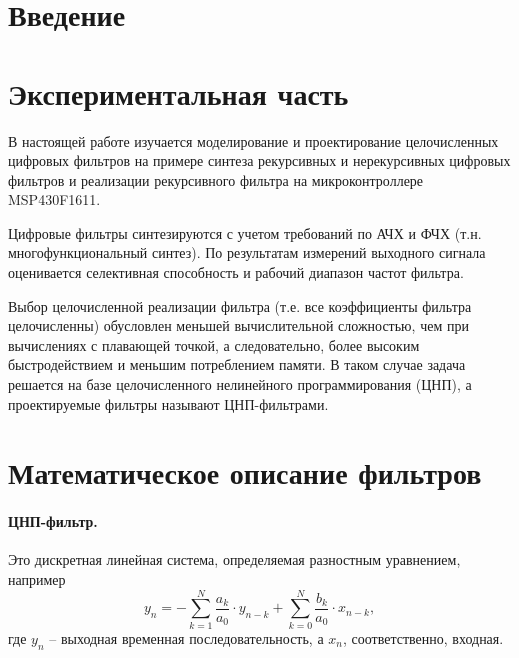 



\def\labauthors{Карусевич А.А., Шиков А.П., Виноградов И.Д., Понур К.А.}
\def\labgroup{440}
\def\labnumber{1}
\def\labtheme{Синтез и реализация цифрового целочисленного фильтра на микроконтроллере}
\renewcommand{\vec}{\mathbf}
\renewcommand{\phi}{\varphi}
\renewcommand{\hat}{\widehat}



\section{Введение}
\section{Экспериментальная часть}

В настоящей работе изучается моделирование и проектирование целочисленных цифровых фильтров на примере синтеза рекурсивных и нерекурсивных цифровых фильтров и реализации рекурсивного фильтра на микроконтроллере {MSP430F1611}. 

Цифровые фильтры синтезируются с учетом требований по АЧХ и ФЧХ (т.н. многофункциональный синтез). По результатам измерений выходного сигнала оценивается селективная способность и рабочий диапазон частот фильтра.

Выбор целочисленной реализации фильтра (т.е. все коэффициенты фильтра целочисленны) обусловлен меньшей вычислительной сложностью, чем при вычислениях с плавающей точкой, а следовательно, более высоким быстродействием и меньшим потреблением памяти. В таком случае задача решается на базе целочисленного нелинейного программирования (ЦНП), а проектируемые фильтры называют ЦНП-фильтрами.

\section{Математическое описание фильтров}
\paragraph{ЦНП-фильтр. } Это дискретная линейная система, определяемая разностным уравнением, например
\begin{equation}
  y_{n}=-\sum_{k=1}^{N} \frac{a_{k}}{a_{0}} \cdot y_{n-k}+\sum_{k=0}^{N} \frac{b_{k}}{a_{0}} \cdot x_{n-k},
  \label{eq:iir}
\end{equation}
где $y_{n}$ -- выходная временная последовательность, а $x_{n}$, соответственно, входная.

